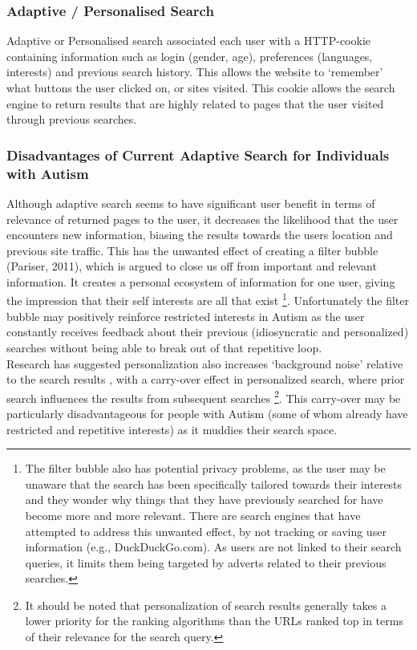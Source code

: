 \documentclass[a4paper, 10pt]{article}
\begin{document}
\subsubsection{Adaptive / Personalised Search}
Adaptive or Personalised search associated each user with a HTTP-cookie containing information such as login (gender, age), preferences (languages, interests) and previous search history. This allows the website to ‘remember’ what buttons the user clicked on, or sites visited. This cookie allows the search engine to return results that are highly related to pages that the user visited through previous searches. 

\subsubsection{Disadvantages of Current Adaptive Search for Individuals with Autism}
Although adaptive search seems to have significant user benefit in terms of relevance of returned pages to the user, it decreases the likelihood that the user encounters new information, biasing the results towards the users location and previous site traffic.  This has the unwanted effect of creating a filter bubble (Pariser, 2011), which is argued to close us off from important and relevant information. It creates a personal ecosystem of information for one user, giving the impression that their self interests are all that exist \footnote{The filter bubble also has potential privacy problems, as the user may be unaware that the search has been specifically tailored towards their interests and they wonder why things that they have previously searched for have become more and more relevant. There are search engines that have attempted to address this unwanted effect, by not tracking or saving user information (e.g., DuckDuckGo.com). As users are not linked to their search queries, it limits them being targeted by adverts related to their previous searches.}. Unfortunately the filter bubble may positively reinforce restricted interests in Autism as the user constantly receives feedback about their previous (idiosyncratic and personalized) searches without being able to break out of that repetitive loop. \\Research has suggested personalization also increases ‘background noise’ relative to the search results \cite{briggs}, with a carry-over effect in personalized search, where prior search influences the results from subsequent searches \footnote{It should be noted that personalization of search results generally takes a lower priority for the ranking algorithms than the URLs ranked top in terms of their relevance for the search query.}. This carry-over may be particularly disadvantageous for people with Autism (some of whom already have restricted and repetitive interests) as it muddies their search space.\\
\end{document}
